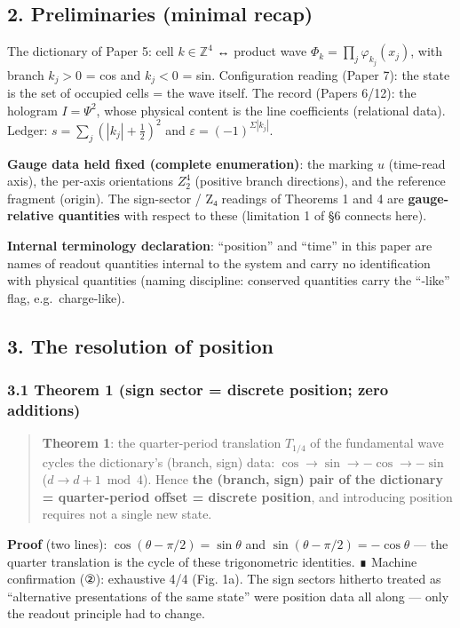 \documentclass[
]{article}
\begin{document}
\subsection{2. Preliminaries (minimal
recap)}\label{preliminaries-minimal-recap}

The dictionary of Paper 5: cell \(k\in\mathbb{Z}^4\) ↔ product wave
\(\Phi_k=\prod_j\varphi_{k_j}(x_j)\), with branch \(k_j>0\) = cos and
\(k_j<0\) = sin. Configuration reading (Paper 7): the state is the set
of occupied cells = the wave itself. The record (Papers 6/12): the
hologram \(I=\Psi^2\), whose physical content is the line coefficients
(relational data). Ledger: \(s=\sum_j(|k_j|+\tfrac12)^2\) and
\(\varepsilon=(-1)^{\Sigma|k_j|}\).

\textbf{Gauge data held fixed (complete enumeration)}: the marking \(u\)
(time-read axis), the per-axis orientations \(Z_2^{4}\) (positive branch
directions), and the reference fragment (origin). The sign-sector / Z₄
readings of Theorems 1 and 4 are \textbf{gauge-relative quantities} with
respect to these (limitation 1 of §6 connects here).

\textbf{Internal terminology declaration}: ``position'' and ``time'' in
this paper are names of readout quantities internal to the system and
carry no identification with physical quantities (naming discipline:
conserved quantities carry the ``-like'' flag, e.g.~charge-like).

\subsection{3. The resolution of
position}\label{the-resolution-of-position}

\subsubsection{3.1 Theorem 1 (sign sector = discrete position; zero
additions)}\label{theorem-1-sign-sector-discrete-position-zero-additions}

\begin{quote}
\textbf{Theorem 1}: the quarter-period translation \(T_{1/4}\) of the
fundamental wave cycles the dictionary's (branch, sign) data:
\(\cos\to\sin\to-\cos\to-\sin\) (\(d\to d+1\bmod4\)). Hence \textbf{the
(branch, sign) pair of the dictionary = quarter-period offset = discrete
position}, and introducing position requires not a single new state.
\end{quote}

\textbf{Proof} (two lines): \(\cos(\theta-\pi/2)=\sin\theta\) and
\(\sin(\theta-\pi/2)=-\cos\theta\) --- the quarter translation is the
cycle of these trigonometric identities. ∎ Machine confirmation (②):
exhaustive 4/4 (Fig. 1a). The sign sectors hitherto treated as
``alternative presentations of the same state'' were position data all
along --- only the readout principle had to change.
\end{document}
